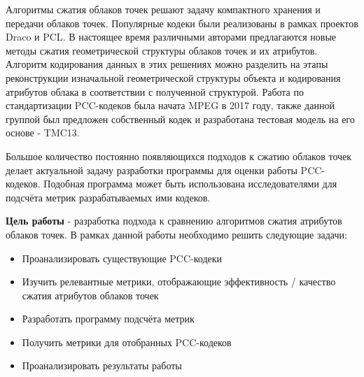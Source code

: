 Алгоритмы сжатия облаков точек решают задачу компактного хранения и передачи
облаков точек. Популярные кодеки были реализованы в рамках проектов
Draco\cite{Draco} и PCL\cite{Rusu_ICRA2011_PCL}. В настоящее время различными
авторами предлагаются новые методы сжатия геометрической структуры облаков
точек\cite{PCGCv2}\cite{quach2020improved} и их
атрибутов\cite{Shao2017}\cite{Chen2020}\cite{Sun2023}. Алгоритм кодирования
данных в этих решениях можно разделить на этапы реконструкции изначальной
геометрической структуры объекта и кодирования атрибутов облака в соответствии с
полученной структурой. Работа по стандартизации PCC-кодеков была начата MPEG в
2017 году\cite{CallForProposalV2}, также данной группой был предложен
собственный кодек и разработана тестовая модель на его основе -
TMC13\cite{TMC13}.

Большое количество постоянно появляющихся подходов к сжатию облаков точек делает
актуальной задачу разработки программы для оценки работы PCC-кодеков. Подобная
программа может быть использована исследователями для подсчёта метрик
разрабатываемых ими кодеков.

\textbf{Цель работы} - разработка подхода к сравнению алгоритмов сжатия
атрибутов облаков точек. В рамках данной работы необходимо решить следующие
задачи:

\begin{itemize}
    \item Проанализировать существующие PCC-кодеки
    \item Изучить релевантные метрики, отображающие эффективность / качество
    сжатия атрибутов облаков точек
    \item Разработать программу подсчёта метрик
    \item Получить метрики для отобранных PCC-кодеков
    \item Проанализировать результаты работы
\end{itemize}


